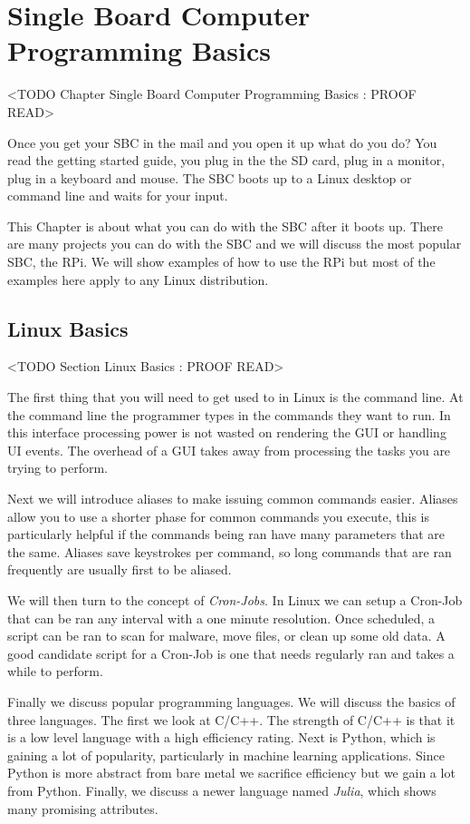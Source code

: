 \chapter{Single Board Computer Programming Basics}
	<TODO Chapter Single Board Computer Programming Basics : PROOF READ>

Once you get your \ac{SBC} in the mail and you open it up what do you do? You read the getting started guide, you plug in the the \ac{SD} card, plug in a monitor, plug in a keyboard and mouse. The \ac{SBC} boots up to a Linux desktop or command line and waits for your input. 

This Chapter is about what you can do with the \ac{SBC} after it boots up. There are many projects you can do with the \ac{SBC} and we will discuss the most popular \ac{SBC}, the \ac{RPi}. We will show examples of how to use the \ac{RPi} but most of the examples here apply to any Linux distribution. 

\section{Linux Basics}
	<TODO Section Linux Basics : PROOF READ>

The first thing that you will need to get used to in Linux is the command line. At the command line the programmer types in the commands they want to run. In this interface processing power is not wasted on rendering the \ac{GUI} or handling \ac{UI} events. The overhead of a \ac{GUI} takes away from processing the tasks you are trying to perform. 

Next we will introduce aliases to make issuing common commands easier. Aliases allow you to use a shorter phase for common commands you execute, this is particularly helpful if the commands being ran have many parameters that are the same. Aliases save keystrokes per command, so long commands that are ran frequently are usually first to be aliased. 

We will then turn to the concept of \emph{Cron-Jobs}. In Linux we can setup a Cron-Job that can be ran any interval with a one minute resolution. Once scheduled, a script can be ran to scan for malware, move files, or clean up some old data. A good candidate script for a Cron-Job is one that needs regularly ran and takes a while to perform. 

Finally we discuss popular programming languages. We will discuss the basics of three languages. The first we look at C/C++. The strength of C/C++ is that it is a low level language with a high efficiency rating. Next is Python, which is gaining a lot of popularity, particularly in machine learning applications. Since Python is more abstract from bare metal we sacrifice efficiency but we gain a lot from Python. Finally, we discuss a newer language named \emph{Julia}, which shows many promising attributes.  
	
